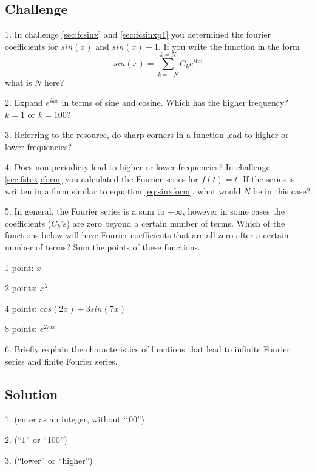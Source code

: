 \subsection*{Challenge}
1. In challenge \ref{sec:fcsinx} and \ref{sec:fcsinxp1} you determined the fourier coefficients for $sin(x)$ and $sin(x)+1$. If you write the function in the form
\begin{equation}
    \label{eq:sinxform}
    sin(x)=\sum_{k=-N}^{k=N} C_k e^{i k x}
\end{equation}
what is $N$ here?

\vspace{1em}
2. Expand $e^{i k x}$ in terms of sine and cosine. Which has the higher frequency? $k=1$ or $k=100$?

\vspace{1em}
3. Referring to the resource, do sharp corners in a function lead to higher or lower frequencies?

\vspace{1em}
4. Does non-periodiciy lead to higher or lower frequencies? In challenge \ref{sec:fstexpform} you calculated the Fourier series for $f(t)=t$. If the series is written in a form similar to equation \ref{eq:sinxform}, what would $N$ be in this case?

\vspace{1em}
5. In general, the Fourier series is a sum to $\pm \infty$, however in some cases the coefficients ($C_k$'s) are zero beyond a certain number of terms. Which of the functions below will have Fourier coefficients that are all zero after a certain number of terms? Sum the points of these functions.

1 point: $x$

2 points: $x^2$

4 points: $cos(2 x) + 3 sin(7 x)$

8 points: $e^{2 \pi i x}$

\vspace{1em}
6. Briefly explain the characteristics of functions that lead to infinite Fourier series and finite Fourier series.

\subsection*{Solution}
1. (enter as an integer, without ``.00'')  

2. (``1'' or ``100'') 

3. (``lower'' or ``higher'') 

